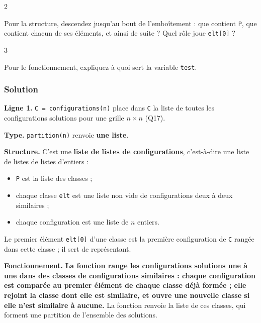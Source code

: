 \documentclass[11pt,a4paper]{article}
\providecommand{\tightlist}{\setlength{\itemsep}{0pt}\setlength{\parskip}{0pt}}
\begin{document}
\begin{indication}{2}

Pour la structure, descendez jusqu'au bout de l'emboîtement : que contient \texttt{P}, que contient chacun de ses éléments, et ainsi de suite ? Quel rôle joue \texttt{elt{[}0{]}} ?

\end{indication}

\begin{indication}{3}

Pour le fonctionnement, expliquez à quoi sert la variable \texttt{test}.

\end{indication}

\hypertarget{solution-20}{%
\subsubsection{Solution}\label{solution-20}}

\textbf{Ligne 1.} \texttt{C\ =\allowbreak{}\ configurations(\allowbreak{}n)\allowbreak{}} place dans \texttt{C} la liste de toutes les configurations solutions pour une grille \(n \times n\) (Q17).

\textbf{Type.} \texttt{partition(n)} renvoie \textbf{une liste}.

\textbf{Structure.} C'est une \textbf{liste de listes de configurations}, c'est-à-dire une liste de listes de listes d'entiers :

\begin{itemize}
\tightlist
\item
  \texttt{P} est la liste des classes ;
\item
  chaque classe \texttt{elt} est une liste non vide de configurations deux à deux similaires ;
\item
  chaque configuration est une liste de \(n\) entiers.
\end{itemize}

Le premier élément \texttt{elt{[}0{]}} d'une classe est la première configuration de \texttt{C} rangée dans cette classe ; il sert de représentant.

\textbf{Fonctionnement.} \textbf{La fonction range les configurations solutions une à une dans des classes de configurations similaires : chaque configuration est comparée au premier élément de chaque classe déjà formée ; elle rejoint la classe dont elle est similaire, et ouvre une nouvelle classe si elle n'est similaire à aucune.} La fonction renvoie la liste de ces classes, qui forment une partition de l'ensemble des solutions.
\end{document}

